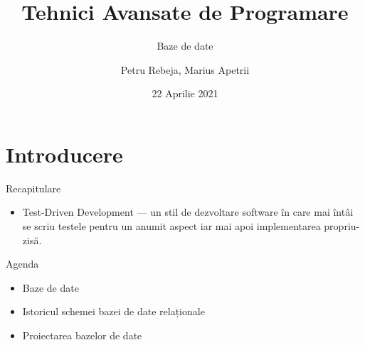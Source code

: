 \documentclass[presentation]{beamer}
\author{Petru Rebeja, Marius Apetrii}
\date{22 Aprilie 2021}
\title{Tehnici Avansate de Programare}
\subtitle{Baze de date}
\institute[UAIC]{Facultatea de Matematică\\Universitatea Alexandru Ioan Cuza, Iași}
\begin{document}
\maketitle
\section{Introducere}
\label{sec:orgbe95f49}
\begin{frame}[label={sec:org5dfeac3}]{Recapitulare}
\begin{itemize}
\item \alert{Test-Driven Development} --- un stil de dezvoltare software în care mai întâi se scriu testele pentru un anumit aspect iar mai apoi implementarea propriu-zisă.
\end{itemize}
\end{frame}
\begin{frame}[label={sec:orga875c79}]{Agenda}
\begin{itemize}
\item Baze de date
\item Istoricul schemei bazei de date relaționale
\item Proiectarea bazelor de date
\end{itemize}
\end{frame}
\end{document}
